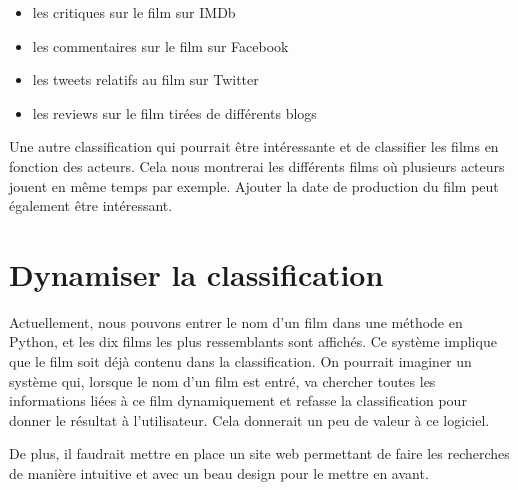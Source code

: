 \begin{itemize}
 \item les critiques sur le film sur IMDb
 \item les commentaires sur le film sur Facebook
 \item les tweets relatifs au film sur Twitter
 \item les reviews sur le film tirées de différents blogs
\end{itemize}

\vspace{0.4cm}

Une autre classification qui pourrait être intéressante et de classifier les films en fonction des acteurs. Cela nous montrerai les différents films où plusieurs acteurs jouent en même temps par exemple. Ajouter la date de production du film peut également être intéressant.

\section{Dynamiser la classification}

Actuellement, nous pouvons entrer le nom d'un film dans une méthode en Python, et les dix films les plus ressemblants sont affichés. Ce système implique que le film soit déjà contenu dans la classification. On pourrait imaginer un système qui, lorsque le nom d'un film est entré, va chercher toutes les informations liées à ce film dynamiquement et refasse la classification pour donner le résultat à l'utilisateur. Cela donnerait un peu de valeur à ce logiciel.

De plus, il faudrait mettre en place un site web permettant de faire les recherches de manière intuitive et avec un beau design pour le mettre en avant.




